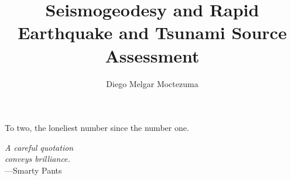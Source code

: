 
\title{Seismogeodesy and Rapid Earthquake and Tsunami Source Assessment}

\author{Diego Melgar Moctezuma}


%
\begin{frontmatter}

%
%
\makefrontmatter 

%
%   
%
%
%
%
\begin{dedication} 
  To two, the loneliest number since the number one.
\end{dedication}


%   
% 



%
%
\begin{epigraph} %
  \emph{A careful quotation\\
  conveys brilliance.}\\
  ---Smarty Pants
\end{epigraph}


\end{frontmatter}
